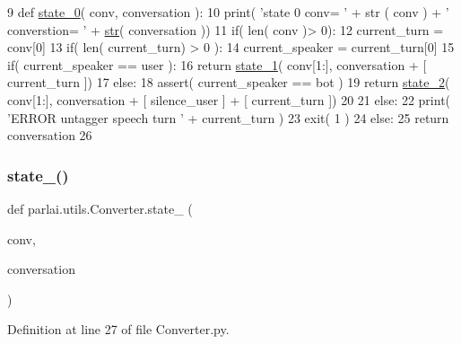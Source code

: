 \begin{DoxyCode}
9 \textcolor{keyword}{def }\hyperlink{namespaceparlai_1_1utils_1_1Converter_a70095b67e171470e875dd9812d53fbc5}{state\_0}( conv, conversation ):
10     print( \textcolor{stringliteral}{'state 0 conv= '} + str ( conv ) + \textcolor{stringliteral}{' converstion= '} + \hyperlink{namespacegenerate__task__READMEs_a5b88452ffb87b78c8c85ececebafc09f}{str}( conversation ))
11     if( len( conv )> 0):
12         current\_turn = conv[0]
13         if( len( current\_turn) > 0 ):
14             current\_speaker = current\_turn[0]
15             if( current\_speaker == user ):
16                 \textcolor{keywordflow}{return} \hyperlink{namespaceparlai_1_1utils_1_1Converter_a6e544c13c3304bc8e97127997e507bb3}{state\_1}( conv[1:], conversation + [ current\_turn ])
17             \textcolor{keywordflow}{else}:
18                 assert( current\_speaker == bot )
19                 \textcolor{keywordflow}{return} \hyperlink{namespaceparlai_1_1utils_1_1Converter_a051af07ed1e796ee044390b710646091}{state\_2}( conv[1:], conversation + [ silence\_user ] + [ current\_turn ])
20             
21         \textcolor{keywordflow}{else}:
22             print( \textcolor{stringliteral}{'ERROR untagger speech turn '} + current\_turn )
23             exit( 1 )
24     \textcolor{keywordflow}{else}:
25         \textcolor{keywordflow}{return} conversation
26 
\end{DoxyCode}
\mbox{\label{namespaceparlai_1_1utils_1_1Converter_a6e544c13c3304bc8e97127997e507bb3}} 
\subsubsection{\texorpdfstring{state\+\_()}{state\_1()}}
{\footnotesize\ttfamily def parlai.\+utils.\+Converter.\+state\+\_ (\begin{DoxyParamCaption}\item[{}]{conv,  }\item[{}]{conversation }\end{DoxyParamCaption})}



Definition at line 27 of file Converter.\+py.


